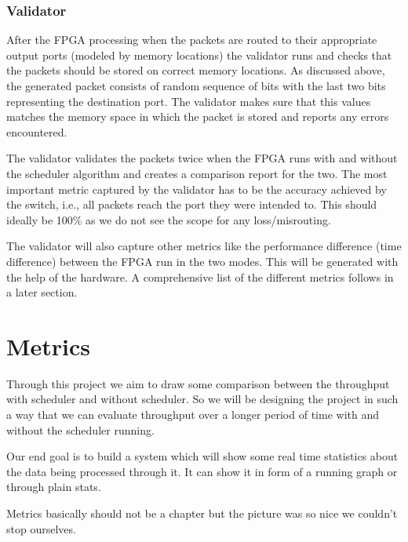 \documentclass[twoside,12pt,fleqn]{book} %
\begin{document}
\subsection{Validator}
After the FPGA processing when the packets are routed to their appropriate output ports (modeled by memory locations) the validator runs and checks that the packets should be stored on correct memory locations. As discussed above, the generated packet consists of random sequence of bits with the last two bits representing the destination port. The validator makes sure that this values matches the memory space in which the packet is stored and reports any errors encountered.
\par\vspace{\baselineskip}
The validator validates the packets twice when the FPGA runs with and without the scheduler algorithm and creates a comparison report for the two. The most important metric captured by the validator has to be the accuracy achieved by the switch, i.e., all packets reach the port they were intended to. This should ideally be 100\% as we do not see the scope for any loss/misrouting.
\par\vspace{\baselineskip}
The validator will also capture other metrics like the performance difference (time difference) between the FPGA run in the two modes. This will be generated with the help of the hardware. A comprehensive list of the different metrics follows in a later section. 

\chapter{Metrics}
Through this project we aim to draw some comparison between the throughput with scheduler and without scheduler. So we will be designing the project in such a way that we can evaluate throughput over a longer period of time with and without the scheduler running.
\par\vspace{\baselineskip}
Our end goal is to build a system which will show some real time statistics about the data being processed through it. It can show it in form of a running graph or through plain stats. 

\begin{remark}
Metrics basically should not be a chapter but the picture was so nice we couldn't stop ourselves.
\end{remark}
\end{document}
